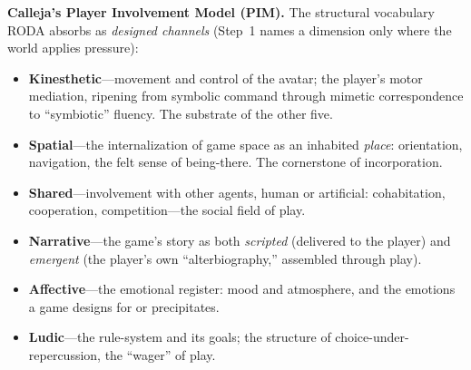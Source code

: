\documentclass[11pt]{article}
\begin{document}
\medskip
\noindent\textbf{Calleja's Player Involvement Model (PIM).} The structural vocabulary RODA absorbs as \emph{designed channels} (Step~1 names a dimension only where the world applies pressure):
\begin{itemize}
  \item \textbf{Kinesthetic}---movement and control of the avatar; the player's motor mediation, ripening from symbolic command through mimetic correspondence to ``symbiotic'' fluency. The substrate of the other five.
  \item \textbf{Spatial}---the internalization of game space as an inhabited \emph{place}: orientation, navigation, the felt sense of being-there. The cornerstone of incorporation.
  \item \textbf{Shared}---involvement with other agents, human or artificial: cohabitation, cooperation, competition---the social field of play.
  \item \textbf{Narrative}---the game's story as both \emph{scripted} (delivered to the player) and \emph{emergent} (the player's own ``alterbiography,'' assembled through play).
  \item \textbf{Affective}---the emotional register: mood and atmosphere, and the emotions a game designs for or precipitates.
  \item \textbf{Ludic}---the rule-system and its goals; the structure of choice-under-repercussion, the ``wager'' of play.
\end{itemize}
\end{document}
